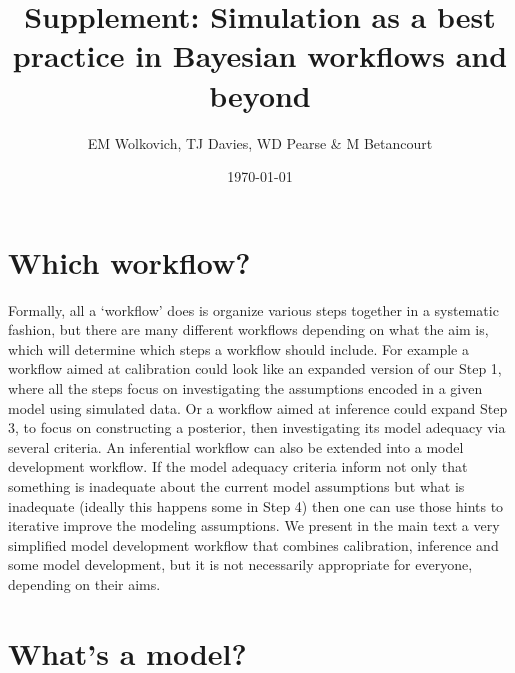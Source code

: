 \documentclass[11pt]{article}
\begin{document}

\renewcommand{\refname}{\CHead{}}

\title{Supplement: Simulation as a best practice in Bayesian workflows and beyond}
\date{\today}
\author{EM Wolkovich, TJ Davies, WD Pearse \& M Betancourt}
\maketitle

\section{Which workflow?}

Formally, all a `workflow' does is organize various steps together in a systematic fashion, but there are many different workflows depending on what the aim is, which will determine which steps a workflow should include. For example a workflow aimed at calibration could look like an expanded version of our Step 1, where all the steps focus on investigating the assumptions encoded in a given model using simulated data. Or a workflow aimed at inference could expand Step 3, to focus on constructing a posterior, then investigating its model adequacy via several criteria. An inferential workflow can also be extended into a model development workflow.  If the model adequacy criteria inform not only that something is inadequate about the current model assumptions but what is inadequate (ideally this happens some in Step 4) then one can use those hints to iterative improve the modeling assumptions. We present in the main text a very simplified model development workflow that combines calibration, inference and some model development, but it is not necessarily appropriate for everyone, depending on their aims.


\section{What's a model?}
\end{document}
